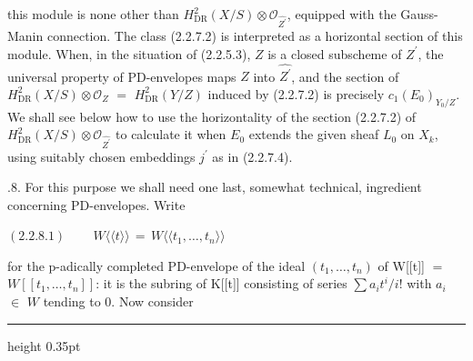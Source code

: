 \documentclass[9pt]{article}
\newcommand{\CanonText}[1]{\par{\fontsize{8.0}{9.35}\selectfont\RaggedRight #1\par}\vspace{2.2pt}}
\newcommand{\CanonDisplay}[1]{\par\vspace{1.2pt}\begin{center}{\fontsize{7.2}{8.4}\selectfont\(\displaystyle #1\)}\end{center}\vspace{1.2pt}}
\begin{document}
\begin{minipage}[t][\dimexpr\textheight-5pt\relax][t]{\textwidth}
\CanonText{this module is none other than \(H^{2}_{\mathrm{DR}}(X/S)\otimes{}\mathcal{O}_{\widehat{Z^{\prime}}}\), equipped with the Gauss-Manin connection. The class (2.2.7.2) is interpreted as a horizontal section of this module. When, in the situation of (2.2.5.3), \(Z\) is a closed subscheme of \(Z^{\prime}\), the universal property of PD-envelopes maps \(Z\) into \(\widehat{Z^{\prime}}\), and the section of \(H^{2}_{\mathrm{DR}}(X/S)\otimes{}\mathcal{O}_{Z}\) \(=\) \(H^{2}_{\mathrm{DR}}(Y/Z)\) induced by (2.2.7.2) is precisely \(c_{1}(E_{0})_{Y_{0}/Z}\). We shall see below how to use the horizontality of the section (2.2.7.2) of \(H^{2}_{\mathrm{DR}}(X/S)\otimes{}\mathcal{O}_{\widehat{Z^{\prime}}}\) to calculate it when \(E_{0}\) extends the given sheaf \(L_{0}\) on \(X_{k}\), using suitably chosen embeddings \(j^{\prime}\) as in (2.2.7.4).}
\CanonText{2.2.8. For this purpose we shall need one last, somewhat technical, ingredient concerning PD-envelopes. Write}
\CanonDisplay{(2.2.8.1)\qquad\,W\langle{}\langle{}t\rangle{}\rangle{}\,=\,W\langle{}\langle{}t_{1},\ldots{},t_{n}\rangle{}\rangle{}}
\CanonText{for the p-adically completed PD-envelope of the ideal \((t_{1},\ldots{},t_{n})\) of W[[t]] \(=\) \(W[[t_{1},\ldots{},t_{n}]]\): it is the subring of K[[t]] consisting of series \(\sum{}a_{i}t^{i}/i\)! with \(a_{i}\) \(\in{}\) \(W\) tending to 0. Now consider}
\vfill
{\color{Accent}\hrule height 0.35pt}\vspace{3pt}
\end{minipage}
\newpage
\end{document}
